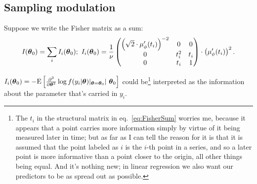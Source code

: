 \subsection{Sampling modulation}
Suppose we write the Fisher matrix as a sum:
\begin{equation}\label{eq:FisherSum}
	\Fisher = \sum_i \Fisher[i]; 
	~\Fisher[i] = \frac1\nu\begin{pmatrix}
	\bkt{\sqrt2\cdot\mupp}^{-2} & 0 		& 0 \\
	0		 & t_i^2 	& t_i \\
	0		 &	t_i	    & 1
	\end{pmatrix}\cdot\bkt{\mupp}^2.
\end{equation}

$\Fisher[i] = -\XpctO{\frac{\partial^2}{\partial\pars^2}\log f(y_i|\pars)\vert_{\pars=\pars_0}}$ could be\footnote{The $t_i$ in the structural matrix in eq.~\eqref{eq:FisherSum} worries me, because it appears that a point carries more information simply by virtue of it being measured later in time; but as far as I can tell the reason for it is that it is assumed that the point labeled as $i$ is the $i$-th point in a series, and so a later point is more informative than a point closer to the origin, all other things being equal. And it's nothing new; in linear regression we also want our predictors to be as spread out as possible.} interpreted as the information about the parameter that's carried in $y_i$.

